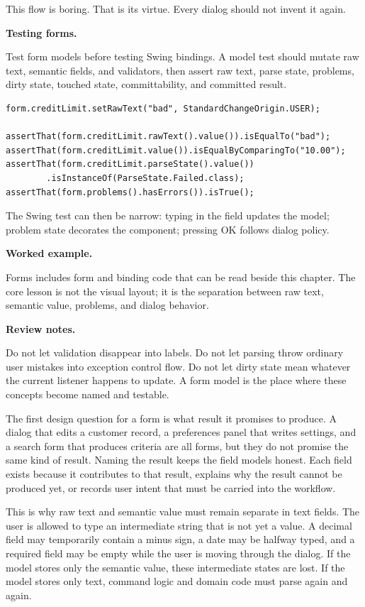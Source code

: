 This flow is boring. That is its virtue. Every dialog should not invent it
again.

\textbf{Testing forms.}

Test form models before testing Swing bindings. A model test should mutate raw
text, semantic fields, and validators, then assert raw text, parse state,
problems, dirty state, touched state, committability, and committed result.

\begin{lstlisting}[caption={Testing invalid intermediate input.}]
form.creditLimit.setRawText("bad", StandardChangeOrigin.USER);

assertThat(form.creditLimit.rawText().value()).isEqualTo("bad");
assertThat(form.creditLimit.value()).isEqualByComparingTo("10.00");
assertThat(form.creditLimit.parseState().value())
        .isInstanceOf(ParseState.Failed.class);
assertThat(form.problems().hasErrors()).isTrue();
\end{lstlisting}

The Swing test can then be narrow: typing in the field updates the model; problem
state decorates the component; pressing OK follows dialog policy.

\textbf{Worked example.}

\begin{examplebox}{Forms}
\swingIntegrationExample{} includes form and binding code that can be read beside
this chapter. The core lesson is not the visual layout; it is the separation
between raw text, semantic value, problems, and dialog behavior.
\end{examplebox}

\textbf{Review notes.}

Do not let validation disappear into labels. Do not let parsing throw ordinary
user mistakes into exception control flow. Do not let dirty state mean whatever
the current listener happens to update. A form model is the place where these
concepts become named and testable.

The first design question for a form is what result it promises to produce. A
dialog that edits a customer record, a preferences panel that writes settings,
and a search form that produces criteria are all forms, but they do not promise
the same kind of result. Naming the result keeps the field models honest. Each
field exists because it contributes to that result, explains why the result
cannot be produced yet, or records user intent that must be carried into the
workflow.

This is why raw text and semantic value must remain separate in text fields. The
user is allowed to type an intermediate string that is not yet a value. A
decimal field may temporarily contain a minus sign, a date may be halfway typed,
and a required field may be empty while the user is moving through the dialog.
If the model stores only the semantic value, these intermediate states are lost.
If the model stores only text, command logic and domain code must parse again and
again.

